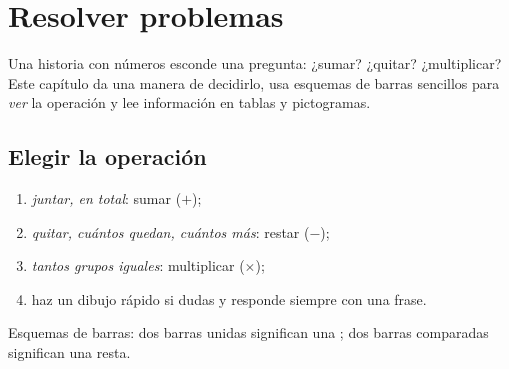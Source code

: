 \chapter{Resolver problemas}\label{ch:g2:problems}

Una historia con números esconde una pregunta: ¿sumar? ¿quitar? ¿multiplicar?
Este capítulo da una manera de decidirlo, usa esquemas de barras sencillos para
\emph{ver} la operación y lee información en tablas y
pictogramas.

\section{Elegir la operación}

\begin{method}\label{met:g2:problems:choose}
\begin{enumerate}
  \item \emph{juntar, en total}: sumar ($+$);
  \item \emph{quitar, cuántos quedan, cuántos más}: restar
        ($-$);
  \item \emph{tantos grupos iguales}: multiplicar ($\times$);
  \item haz un dibujo rápido si dudas y responde siempre con una
        frase.
\end{enumerate}
\end{method}

\begin{omfigure}

{\small Esquemas de barras: dos barras unidas significan una ; dos barras
comparadas significan una resta.}
\end{omfigure}

